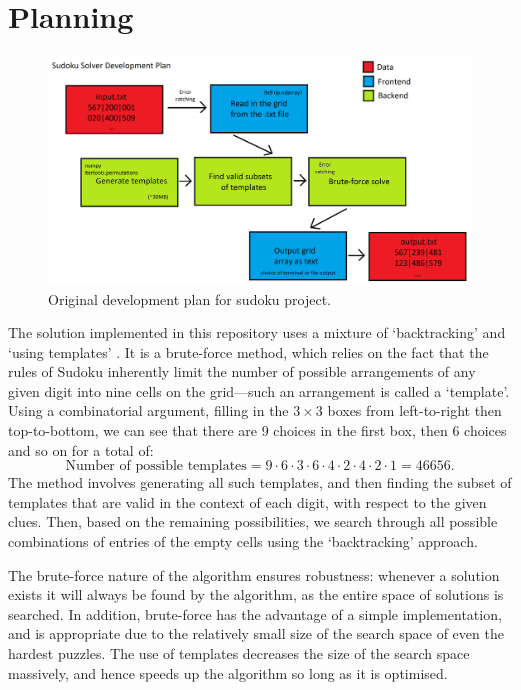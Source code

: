 \documentclass[12pt]{article}
\begin{document}
\section{Planning}

\begin{figure}[hbt]
    \includegraphics[scale=0.23]{sudokuplan1.png}
    \caption{Original development plan for sudoku project.}
    \label{plan1}
\end{figure}

The solution implemented in this repository uses a mixture of `backtracking' and `using templates' \cite{wiki1}.
It is a brute-force method, which relies on the fact that the rules of Sudoku inherently limit the number of possible arrangements of any given digit into nine cells on the grid---such an arrangement is called a `template'.
Using a combinatorial argument, filling in the $3\times3$ boxes from left-to-right then top-to-bottom, we can see that there are 9 choices in the first box, then 6 choices and so on for a total of:
\[
    \text{Number of possible templates} = 9\cdot6\cdot3\cdot6\cdot4\cdot2\cdot4\cdot2\cdot1 = 46656.
\]
The method involves generating all such templates, and then finding the subset of templates that are valid in the context of each digit, with respect to the given clues.
Then, based on the remaining possibilities, we search through all possible combinations of entries of the empty cells using the `backtracking' approach.

The brute-force nature of the algorithm ensures robustness: whenever a solution exists it will always be found by the algorithm, as the entire space of solutions is searched.
In addition, brute-force has the advantage of a simple implementation, and is appropriate due to the relatively small size of the search space of even the hardest puzzles.
The use of templates decreases the size of the search space massively, and hence speeds up the algorithm so long as it is optimised.
\end{document}
